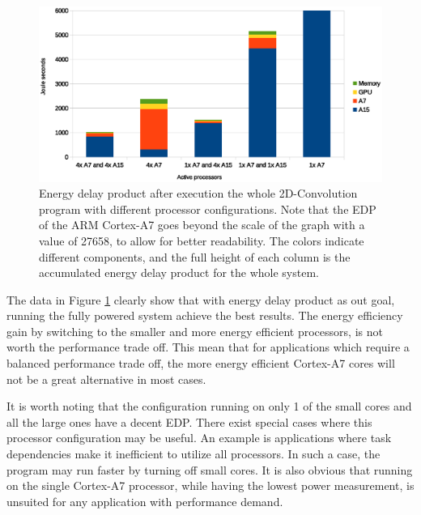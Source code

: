 \begin{figure}[H]
  \centering
  \includegraphics[width=160mm]{fig/EDP-configurations.eps}
  \caption{Energy delay product after execution the whole 2D-Convolution program with different processor configurations. Note that the EDP of the ARM Cortex-A7 goes beyond the scale of the graph with a value of 27658, to allow for better readability. The colors indicate different components, and the full height of each column is the accumulated energy delay product for the whole system.\label{EDP-graph}}
\end{figure}

The data in Figure \ref{EDP-graph} clearly show that with energy delay product as out goal, running the fully powered system achieve the best results.
The energy efficiency gain by switching to the smaller and more energy efficient processors, is not worth the performance trade off.
This mean that for applications which require a balanced performance trade off, the more energy efficient Cortex-A7 cores will not be a great alternative in most cases.

It is worth noting that the configuration running on only 1 of the small cores and all the large ones have a decent EDP.
There exist special cases where this processor configuration may be useful.
An example is applications where task dependencies make it inefficient to utilize all processors.
In such a case, the program may run faster by turning off small cores.
It is also obvious that running on the single Cortex-A7 processor, while having the lowest power measurement, is unsuited for any application with performance demand.

